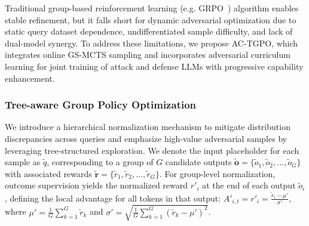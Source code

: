 \documentclass[11pt]{article}
\def\attackmethod{GS-MCTS}
\def\trainingmethod{AC-TGPO}
\begin{document}
Traditional group-based reinforcement learning (e.g. GRPO~\citep{shao2024deepseekmath}) algorithm enables stable refinement, but it falls short for dynamic adversarial optimization due to static query dataset dependence, undifferentiated sample difficulty, and lack of dual-model synergy. To address these limitations, we propose {\trainingmethod}, which integrates online {\attackmethod} sampling and incorporates adversarial curriculum learning for joint training of attack and defense LLMs with progressive capability enhancement.






\subsubsection{Tree-aware Group Policy Optimization} 
We introduce a hierarchical normalization mechanism to mitigate distribution discrepancies across queries and emphasize high-value adversarial samples by leveraging tree-structured exploration. We denote the input placeholder for each sample as $\widetilde{q}$, corresponding to a group of $G$ candidate outputs $\mathbf{\widetilde{o}} = \{\widetilde{o}_1, \widetilde{o}_2, ..., \widetilde{o}_G\}$ with associated rewards $\mathbf{\widetilde{r}} = \{\widetilde{r}_1, \widetilde{r}_2, ..., \widetilde{r}_G\}$. For group-level normalization, outcome supervision yields the normalized reward $r'_i$ at the end of each output $\widetilde{o}_i$, defining the local advantage for all tokens in that output: $A'_{i,t} = r'_i = \frac{\widetilde{r}_i - \mu'}{\sigma'}$, where $\mu' = \frac{1}{G} \sum_{k=1}^{G} \widetilde{r}_k$ and $\sigma' = \sqrt{ \frac{1}{G} \sum_{k=1}^{G} (\widetilde{r}_k - \mu')^2 }$. 
\end{document}
